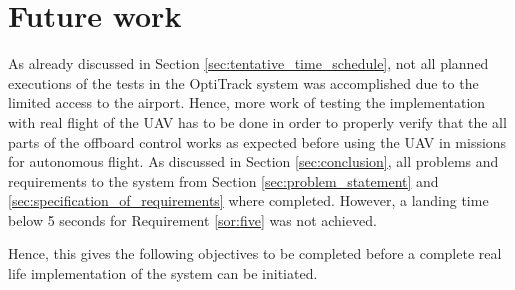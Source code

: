 \documentclass[../Head/report.tex]{subfiles}
\begin{document}
\section{Future work}
\label{sec:future_work}

As already discussed in Section \ref{sec:tentative_time_schedule}, not all planned executions of the tests in the OptiTrack system was accomplished due to the limited access to the airport. Hence, more work of testing the implementation with real flight of the UAV has to be done in order to properly verify that the all parts of the offboard control works as expected before using the UAV in missions for autonomous flight. As discussed in Section \ref{sec:conclusion}, all problems and requirements to the system from Section \ref{sec:problem_statement} and \ref{sec:specification_of_requirements} where completed. However, a landing time below 5 seconds for Requirement \ref{sor:five} was not achieved. 

Hence, this gives the following objectives to be completed before a complete real life implementation of the system can be initiated. 
\end{document}
